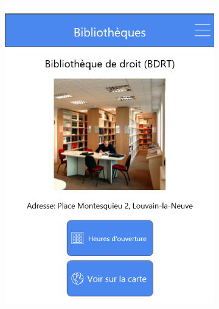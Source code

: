 \documentclass{eplmastersthesis}
\begin{document}
\begin{figure}[H]
\begin{subfigure}[b]{0.3\textwidth}
        \includegraphics[width=\textwidth]{Images/InVision/biblidetail.png}
    \end{subfigure}
    ~ %
    \begin{subfigure}[b]{0.3\textwidth}

\end{subfigure}
\end{figure}
\end{document}
